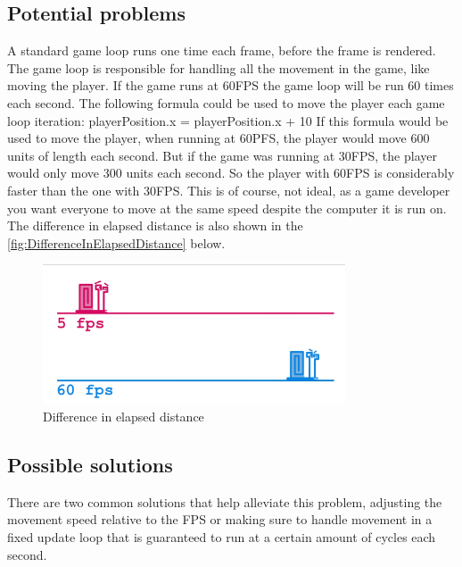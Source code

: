 \documentclass{article} %
\begin{document}
\subsection{Potential problems}
A standard game loop runs one time each frame, before the frame is rendered.
The game loop is responsible for handling all the movement in the game, like moving the player.
If the game runs at 60FPS the game loop will be run 60 times each second.
\newline\newline
The following formula could be used to move the player each game loop iteration:
\newline
playerPosition.x = playerPosition.x + 10
\newline\newline
If this formula would be used to move the player, when running at 60PFS, the player would move 600 units of length each second.
But if the game was running at 30FPS, the player would only move 300 units each second.
So the player with 60FPS is considerably faster than the one with 30FPS.
This is of course, not ideal, as a game developer you want everyone to move at the same speed despite the computer it is run on.
The difference in elapsed distance is also shown in the \autoref{fig:DifferenceInElapsedDistance} below.
\begin{figure}[h!]
    \centering
    \includegraphics[width=0.8\textwidth]{difference_in_distance.png}
    \caption{Difference in elapsed distance}
    \label{fig:DifferenceInElapsedDistance}
\end{figure}

\subsection{Possible solutions}
There are two common solutions that help alleviate this problem, adjusting the movement speed relative to the FPS or making sure to handle movement in a fixed update loop that is guaranteed to run at a certain amount of cycles each second.
\end{document}
